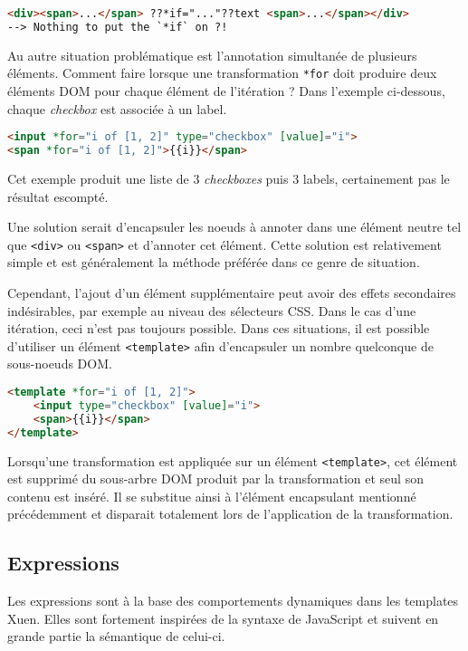 \begin{lstlisting}[language=HTML]
<div><span>...</span> ??*if="..."??text <span>...</span></div>
--> Nothing to put the `*if` on ?!
\end{lstlisting}

Au autre situation problématique est l'annotation simultanée de plusieurs éléments. Comment faire lorsque une transformation \texttt{*for} doit produire deux éléments DOM pour chaque élément de l'itération ? Dans l'exemple ci-dessous, chaque \emph{checkbox} est associée à un label.

\begin{lstlisting}[language=HTML]
<input *for="i of [1, 2]" type="checkbox" [value]="i">
<span *for="i of [1, 2]">{{i}}</span>
\end{lstlisting}

Cet exemple produit une liste de 3 \emph{checkboxes} puis 3 labels, certainement pas le résultat escompté.

Une solution serait d'encapsuler les noeuds à annoter dans une élément neutre tel que \texttt{<div>} ou \texttt{<span>} et d'annoter cet élément. Cette solution est relativement simple et est généralement la méthode préférée dans ce genre de situation.

Cependant, l'ajout d'un élément supplémentaire peut avoir des effets secondaires indésirables, par exemple au niveau des sélecteurs CSS. Dans le cas d'une itération, ceci n'est pas toujours possible. Dans ces situations, il est possible d'utiliser un élément \texttt{<template>} afin d'encapsuler un nombre quelconque de sous-noeuds DOM.

\begin{lstlisting}[language=HTML]
<template *for="i of [1, 2]">
	<input type="checkbox" [value]="i">
	<span>{{i}}</span>
</template>
\end{lstlisting}

Lorsqu'une transformation est appliquée sur un élément \texttt{<template>}, cet élément est supprimé du sous-arbre DOM produit par la transformation et seul son contenu est inséré. Il se substitue ainsi à l'élément encapsulant mentionné précédemment et disparait totalement lors de l'application de la transformation.

\subsection{Expressions} \label{sec:web-usage-expr}
Les expressions sont à la base des comportements dynamiques dans les templates Xuen. Elles sont fortement inspirées de la syntaxe de JavaScript et suivent en grande partie la sémantique de celui-ci.

